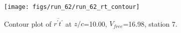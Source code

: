 \begin{figure}[H]
\centering
\texttt{[image: figs/run\_62/run\_62\_rt\_contour]}
\caption{Contour plot of $\overline{r^\prime t^\prime}$ at $z/c$=10.00, $V_{free}$=16.98, station 7.}
\label{fig:run_62_rt_contour}
\end{figure}


